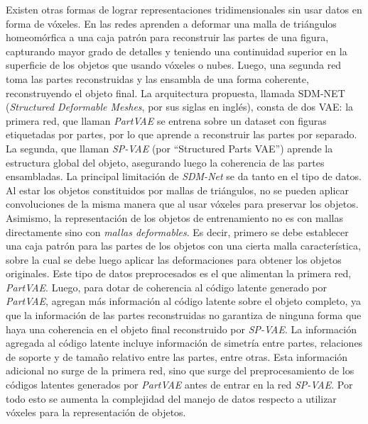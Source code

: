 \documentclass[12pt, spanish]{article}
\begin{document}
Existen otras formas de lograr representaciones tridimensionales sin 
usar datos en forma de vóxeles. En \cite{Gao2019} las redes aprenden a
deformar una malla de triángulos homeomórfica a una caja patrón para
reconstruir las partes de una figura, capturando mayor grado de detalles
y teniendo una continuidad superior en la superficie de los objetos que
usando vóxeles o nubes. Luego, una segunda red toma las partes reconstruidas
y las ensambla de una forma coherente, reconstruyendo el objeto final.
La arquitectura propuesta, llamada SDM-NET
(\textit{Structured Deformable Meshes}, por sus siglas en inglés),
consta de dos VAE: la primera red, que llaman
\textit{PartVAE} se entrena sobre un dataset con figuras etiquetadas
por partes, por lo que aprende a reconstruir las partes por separado.
La segunda, que llaman \textit{SP-VAE} (por ``Structured Parts VAE'')
aprende la estructura global del objeto, asegurando luego la coherencia
de las partes ensambladas.
La principal limitación de \textit{SDM-Net} se da tanto en el tipo de datos.
Al estar los objetos constituidos por mallas de triángulos, no se pueden
aplicar convoluciones de la misma manera que al usar vóxeles para preservar
los objetos. Asimismo, la representación de los objetos de entrenamiento
no es con mallas directamente sino con \textit{mallas deformables}. Es decir,
primero se debe establecer una caja patrón para las partes de los objetos con
una cierta malla característica, sobre la cual se debe luego aplicar las
deformaciones para obtener los objetos originales. Este tipo de datos
preprocesados es el que alimentan la primera red, \textit{PartVAE}. Luego, para
dotar de coherencia al código latente generado por \textit{PartVAE}, agregan
más información al código latente sobre el objeto completo, ya que la información
de las partes reconstruidas no garantiza de ninguna forma que haya una coherencia
en el objeto final reconstruido por \textit{SP-VAE}. La información agregada al
código latente incluye información de simetría entre partes, relaciones de soporte
y de tamaño relativo entre las partes, entre otras. Esta información adicional
no surge de la primera red, sino que surge del preprocesamiento de los códigos
latentes generados por \textit{PartVAE} antes de entrar en la red \textit{SP-VAE}.
Por todo esto se aumenta la complejidad del manejo de datos respecto a utilizar
vóxeles para la representación de objetos.
\end{document}
